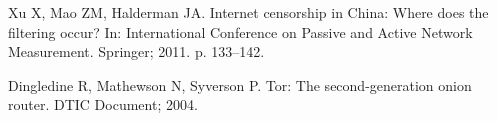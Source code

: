 \documentclass[10pt,letterpaper]{article}
\begin{document}
\begin{thebibliography}{10}
Xu X, Mao ZM, Halderman JA.
\newblock Internet censorship in {China}: {Where} does the filtering occur?
\newblock In: International {Conference} on {Passive} and {Active} {Network}
  {Measurement}. Springer; 2011. p. 133--142.

Dingledine R, Mathewson N, Syverson P.
\newblock Tor: {The} second-generation onion router.
\newblock DTIC Document; 2004.

\end{thebibliography}
\end{document}

